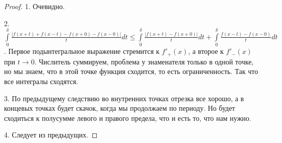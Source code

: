 \begin{proof}
    1. Очевидно.

    2. $\int \limits_{0}^{\delta} \frac{|f(x + t) + f(x - t) - f(x + 0) - f(x - 0)|}{t} dt \le
        \int \limits_{0}^{\delta} \frac{|f(x + t) - f(x  +0)|}{t} dt + \int \limits_{0}^{\delta} \frac{f(x - t) - f(x - 0)}{t} dt$.
    Первое подынтегральное выражение стремится к $f'_+(x)$, а второе к $f'_-(x)$ при $t \to 0$.
    Числитель суммируем, проблема у знаменателя только в одной точке, но мы знаем, что в этой точке функция сходится, то есть ограниченность. Так что все интегралы сходятся.

    3. По предыдущему следствию во внутренних точках отрезка все хорошо, а в концевых точках будет скачок, когда мы продолжаем по периоду. Но будет сходиться к полусумме левого и правого предела, что и есть то, что нам нужно.

    4. Следует из предыдущих.
\end{proof}

\newpage

